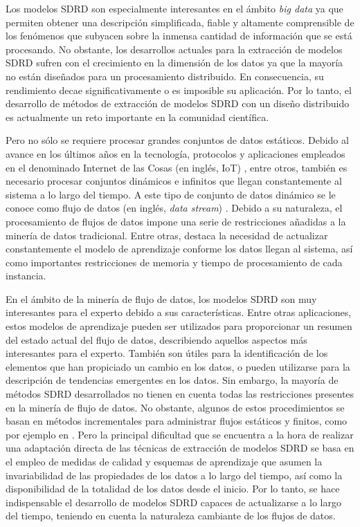 \documentclass[c5paper,10pt,twoside]{book}	   	%
\begin{document}
Los modelos \ac{SDRD} son especialmente interesantes en el ámbito \textit{big data} ya que permiten obtener una descripción simplificada, fiable y altamente comprensible de los fenómenos que subyacen sobre la inmensa cantidad de información que se está procesando. No obstante, los desarrollos actuales para la extracción de modelos \ac{SDRD} sufren con el crecimiento en la dimensión de los datos ya que la mayoría no están diseñados para un procesamiento distribuido. En consecuencia, su rendimiento decae significativamente o es imposible su aplicación. Por lo tanto, el desarrollo de métodos de extracción de modelos \ac{SDRD} con un diseño distribuido es actualmente un reto importante en la comunidad científica.

Pero no sólo se requiere procesar grandes conjuntos de datos estáticos. Debido al avance en los últimos años en la tecnología, protocolos y aplicaciones empleados en el denominado Internet de las Cosas (en inglés, \ac{IoT}) \cite{Agmaa15}, entre otros, también es necesario procesar conjuntos dinámicos e infinitos que llegan constantemente al sistema a lo largo del tiempo. A este tipo de conjunto de datos dinámico se le conoce como flujo de datos (en inglés, \textit{data stream}) \cite{Gama10}. Debido a su naturaleza, el procesamiento de flujos de datos impone una serie de restricciones añadidas a la minería de datos tradicional. Entre otras, destaca la necesidad de actualizar constantemente el modelo de aprendizaje conforme los datos llegan al sistema, así como importantes restricciones de memoria y tiempo de procesamiento de cada instancia. 

En el ámbito de la minería de flujo de datos, los modelos \ac{SDRD} son muy interesantes para el experto debido a sus características. Entre otras aplicaciones, estos modelos de aprendizaje pueden ser utilizados para proporcionar un resumen del estado actual del flujo de datos, describiendo aquellos aspectos más interesantes para el experto. También son útiles para la identificación de los elementos que han propiciado un cambio en los datos, o pueden utilizarse para la descripción de tendencias emergentes en los datos. Sin embargo, la mayoría de métodos \ac{SDRD} desarrollados no tienen en cuenta todas las restricciones presentes en la minería de flujo de datos. No obstante, algunos de estos procedimientos se basan en métodos incrementales para administrar flujos estáticos y finitos, como por ejemplo en \cite{Fr02,Fr06,Lshz14}. Pero la principal dificultad que se encuentra a la hora de realizar una adaptación directa de las técnicas de extracción de modelos \ac{SDRD} se basa en el empleo de medidas de calidad y esquemas de aprendizaje que asumen la invariabilidad de las propiedades de los datos a lo largo del tiempo, así como la disponibilidad de la totalidad de los datos desde el inicio. Por lo tanto, se hace indispensable el desarrollo de modelos SDRD capaces de actualizarse a lo largo del tiempo, teniendo en cuenta la naturaleza cambiante de los flujos de datos.
\end{document}
